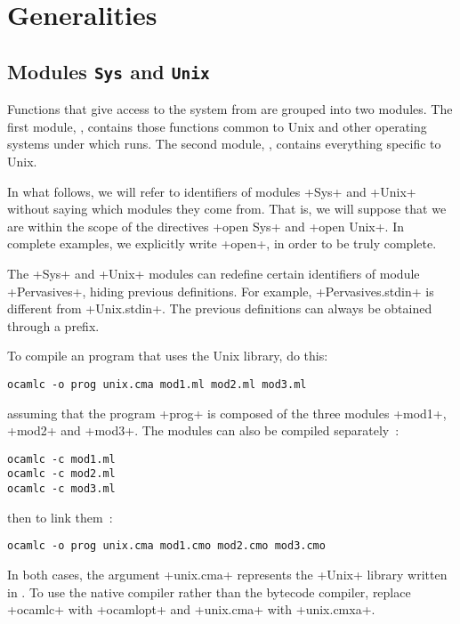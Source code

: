 %
%

\chapter{Generalities}

\section{Modules {\normalfont\texttt{Sys}} and {\normalfont\texttt{Unix}}}

Functions that give access to the system from {\ocaml} are grouped into two
modules. The first module,  , contains those functions
common to Unix and other operating systems under which {\ocaml} runs.
The second module, , contains everything specific to
Unix. 

In what follows, we will refer to identifiers of modules \ml+Sys+ and
\ml+Unix+ without saying which modules they come from.  That is, we
will suppose that we are within the scope of the directives 
\ml+open Sys+ and \ml+open Unix+. In complete examples, we explicitly write
\ml+open+, in order to be truly complete.

The \ml+Sys+ and \ml+Unix+ modules can redefine certain
identifiers of module \ml+Pervasives+, hiding previous
definitions. For example,  \ml+Pervasives.stdin+  is different from 
\ml+Unix.stdin+. The previous definitions can always be obtained
through a prefix.

To compile an {\ocaml} program that uses the 
Unix library, do this:
%
\begin{lstlisting}
ocamlc -o prog unix.cma mod1.ml mod2.ml mod3.ml 
\end{lstlisting}
%
assuming that the program  \ml+prog+ is composed of the three modules  \ml+mod1+,
\ml+mod2+ and \ml+mod3+. The modules can also be compiled separately~:
%
\begin{lstlisting}
ocamlc -c mod1.ml
ocamlc -c mod2.ml
ocamlc -c mod3.ml
\end{lstlisting}
%
then to link them~:
%
\begin{lstlisting}
ocamlc -o prog unix.cma mod1.cmo mod2.cmo mod3.cmo
\end{lstlisting}
%
In both cases, the argument \ml+unix.cma+ represents the \ml+Unix+
library written in {\ocaml}. To use the native compiler rather than the bytecode
compiler, replace \ml+ocamlc+ with \ml+ocamlopt+ and \ml+unix.cma+ with
\ml+unix.cmxa+.

